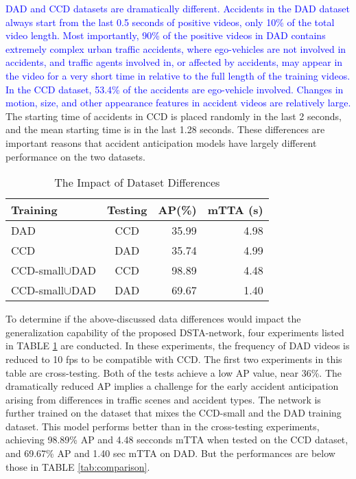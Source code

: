 \documentclass[journal]{IEEEtran}
\begin{document}
\textcolor{blue}{DAD and CCD datasets are dramatically different. Accidents in the DAD dataset always start from the last 0.5 seconds of positive videos, only 10\% of the total video length. Most importantly, 90\% of the positive videos in DAD contains extremely complex urban traffic accidents, where ego-vehicles are not involved in accidents, and traffic agents involved in, or affected by accidents, may appear in the video for a very short time in relative to the full length of the training videos. In the CCD dataset, 53.4\% of the accidents are ego-vehicle involved. Changes in motion, size, and other appearance features in accident videos are relatively large.} The starting time of accidents in CCD is placed randomly in the last 2 seconds, and the mean starting time is in the last 1.28 seconds. These differences are important reasons that accident anticipation models have largely different performance on the two datasets. 
\begin{table}[htbp]
\renewcommand{\arraystretch}{1.3}
    \caption{The Impact of Dataset Differences}
    \label{tab:impact_dataset}
    \centering
    \begin{tabular}{l|c|r|r}
        \hline
         Training & Testing &AP(\%) & mTTA (s)  \\
         \hline
         DAD & CCD & 35.99 & 4.98 \\
         CCD & DAD & 35.74 & 4.99 \\
         CCD-small$\cup$DAD&CCD&{98.89}&{4.48}\\
         CCD-small$\cup$DAD&DAD&{69.67}&{1.40}\\
         \hline
    \end{tabular}
\end{table}
To determine if the above-discussed data differences would impact the generalization capability of the proposed DSTA-network, four experiments listed in TABLE \ref{tab:impact_dataset} are conducted. In these experiments, the frequency of DAD videos is reduced to 10 fps to be compatible with CCD. The first two experiments in this table are cross-testing. Both of the tests achieve a low AP value, near 36\%. The dramatically reduced AP implies a challenge for the early accident anticipation arising from differences in traffic scenes and accident types. The network is further trained on the dataset that mixes the CCD-small and the DAD training dataset. This model performs better than in the cross-testing experiments, achieving 98.89\% AP and 4.48 secconds mTTA when tested on the CCD dataset, and 69.67\% AP and 1.40 sec mTTA on DAD. But the performances are below those in TABLE \ref{tab:comparison}.
\end{document}
